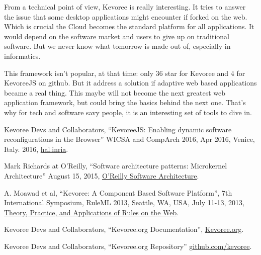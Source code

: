 \documentclass{aes2e}
\begin{document}
From a technical point of view, Kevoree is really interesting. It tries to answer the issue that some desktop applications might encounter if forked on the web. Which is crucial the Cloud becomes the standard platform for all applications. It would depend on the software market and users to give up on traditional software. But we never know what tomorrow is made out of, especially in informatics.
\linebreak
 
This framework isn't popular, at that time: only 36 star for Kevoree and 4 for KevoreeJS on github\cite{DEK5}. But it address a solution if adaptive web based applications became a real thing. This maybe will not become the next greatest web application framework, but could bring the basics behind the next one. That's why for tech and software savy people, it is an interesting set of tools to dive in.
 
\begin{thebibliography}{99}

Kevoree Devs and Collaborators, ``KevoreeJS: Enabling dynamic software reconfigurations in the Browser''
WICSA and CompArch 2016, Apr 2016, Venice, Italy. 2016, \href{https://hal.inria.fr/hal-01354997}{hal.inria}.

Mark Richards at O'Reilly, ``Software architecture patterns: Microkernel Architecture''
August 15, 2015, \href{https://www.oreilly.com/ideas/software-architecture-patterns/page/4/microkernel-architecture}{O'Reilly Software Architecture}.

A. Moawad et al, ``Kevoree: A Component Based Software Platform'', 
7th International Symposium, RuleML 2013, Seattle, WA, USA, July 11-13, 2013,
\href{https://books.google.fr/books?id=Mkm6BQAAQBAJ&pg=PA164&redir_esc=y#v=onepage&q&f=false}{Theory, Practice, and Applications of Rules on the Web}.

Kevoree Devs and Collaborators, ``Kevoree.org Documentation'',
\href{http://kevoree.org/docs/getting-started/what-is-kevoree.html}{Kevoree.org}.

Kevoree Devs and Collaborators, ``Kevoree.org Repository''
\href{https://github.com/kevoree/kevoree}{github.com/kevoree}.


\end{thebibliography}
\end{document}
